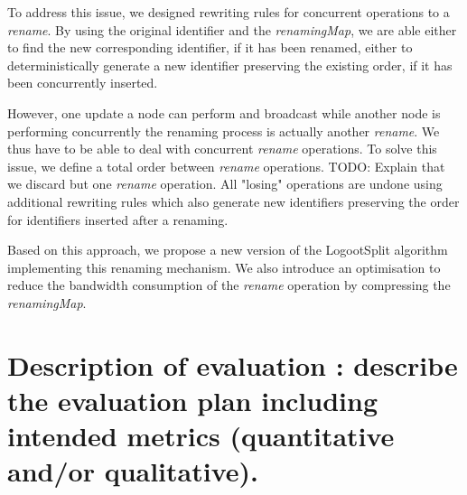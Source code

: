 \documentclass{article}
\begin{document}
To address this issue, we designed rewriting rules for concurrent operations to a \emph{rename}.
By using the original identifier and the \emph{renamingMap}, we are able either to find the new corresponding identifier, if it has been renamed, either to deterministically generate a new identifier preserving the existing order, if it has been concurrently inserted.

However, one update a node can perform and broadcast while another node is performing concurrently the renaming process is actually another \emph{rename}.
We thus have to be able to deal with concurrent \emph{rename} operations.
To solve this issue, we define a total order between \emph{rename} operations.
TODO: Explain that we discard but one \emph{rename} operation. All "losing" operations are undone using additional rewriting rules which also generate new identifiers preserving the order for identifiers inserted after a renaming.

Based on this approach, we propose a new version of the LogootSplit algorithm implementing this renaming mechanism.
We also introduce an optimisation to reduce the bandwidth consumption of the \emph{rename} operation by compressing the \emph{renamingMap}.

\section{Description of evaluation : describe the evaluation plan including intended metrics (quantitative and/or qualitative).}

\end{document}
